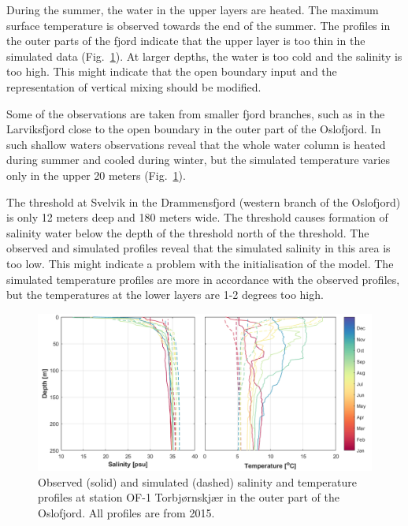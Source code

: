 During the summer, the water in the upper layers are heated. The maximum surface temperature is observed towards the end of the summer. The profiles in the outer parts of the fjord indicate that the upper layer is too thin in the simulated data (Fig.~\ref{fig:CTD_OF-1}). At larger depths, the water is too cold and the salinity is too high. This might indicate that the open boundary input and the representation of vertical mixing should be modified. 

Some of the observations are taken from smaller fjord branches, such as in the Larviksfjord close to the open boundary in the outer part of the Oslofjord. In such shallow waters observations reveal that the whole water column is heated during summer and cooled during winter, but the simulated temperature varies only in the upper 20 meters (Fig.~\ref{fig:CTD_OF-1}). 

The threshold at Svelvik in the Drammensfjord (western branch of the Oslofjord) is only 12 meters deep and 180 meters wide. The threshold causes formation of salinity water below the depth of the threshold north of the threshold. The observed and simulated profiles reveal that the simulated salinity in this area is too low. This might indicate a problem with the initialisation of the model. The simulated temperature profiles are more in accordance with the observed profiles, but the temperatures at the lower layers are 1-2 degrees too high.

\begin{figure}[tbh]
\centerline{
\includegraphics*[trim=0cm 0cm 0cm 0cm,clip=true,width=\textwidth]{Figurer/CTD_OF-1}}
\caption{\small
Observed (solid) and simulated (dashed) salinity and temperature profiles at station OF-1 Torbj{\o}rnskj{\ae}r in the outer part of the Oslofjord. All profiles are from 2015.}
\label{fig:CTD_OF-1}
\end{figure}

